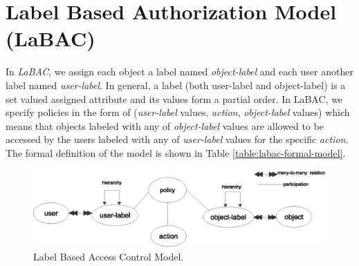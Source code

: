 \section{ Label Based Authorization Model (LaBAC)}
\label{sec:labac}

In \textit{LaBAC}, we assign each object a label named \emph{object-label} and each user another label named \emph{user-label}. In general, a label (both user-label and object-label) is a set valued assigned attribute and its values form a partial order. In LaBAC, we specify policies  in the form of  (\emph{user-label} values, \emph{action},  \emph{object-label} values)   which means that objects labeled with any of \textit{object-label} values are allowed to be accessed by the users labeled with any of  \textit{user-label }values for the specific \textit{action}.  The formal definition of the model is shown in Table \ref{table:labac-formal-model}.


\begin{figure}
\centering
\includegraphics[width=1\textwidth]{labac-model.eps}
\caption{Label Based Access Control Model.}
\label{fig:labac-model}
\end{figure}

